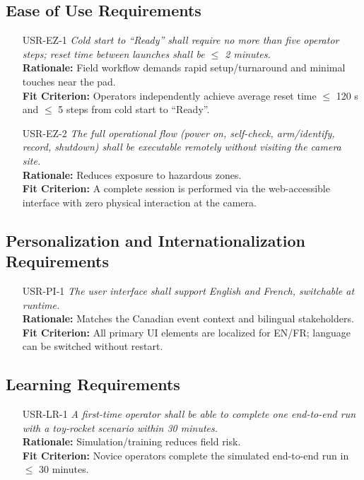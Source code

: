 \documentclass[12pt]{article}
\begin{document}
\subsection{Ease of Use Requirements}
\begin{itemize}[leftmargin=*]
  \item[USR-EZ-1] \emph{Cold start to ``Ready'' shall require no more than five
          operator steps; reset time between launches shall be $\leq$ 2 minutes.}\\
        \textbf{Rationale:} Field workflow demands rapid setup/turnaround and minimal
        touches near the pad.\\ \textbf{Fit Criterion:} Operators independently achieve
        average reset time $\leq$ 120 s and $\leq$ 5 steps from cold start to
        ``Ready''.

  \item[USR-EZ-2] \emph{The full operational flow (power on, self-check, arm/identify,
          record, shutdown) shall be executable remotely without visiting the camera
          site.}\\ \textbf{Rationale:} Reduces exposure to hazardous zones.\\ \textbf{Fit
          Criterion:} A complete session is performed via the web-accessible interface
        with zero physical interaction at the camera.
\end{itemize}

\subsection{Personalization and Internationalization Requirements}
\begin{itemize}[leftmargin=*]
  \item[USR-PI-1] \emph{The user interface shall support English and French, switchable
          at runtime.}\\ \textbf{Rationale:} Matches the Canadian event context and
        bilingual stakeholders.\\ \textbf{Fit Criterion:} All primary UI elements are
        localized for EN/FR; language can be switched without restart.
\end{itemize}

\subsection{Learning Requirements}
\begin{itemize}[leftmargin=*]
  \item[USR-LR-1] \emph{A first-time operator shall be able to complete one end-to-end
          run with a toy-rocket scenario within 30 minutes.}\\ \textbf{Rationale:}
        Simulation/training reduces field risk.\\ \textbf{Fit Criterion:} Novice
        operators complete the simulated end-to-end run in $\leq$ 30 minutes.
\end{itemize}
\end{document}
